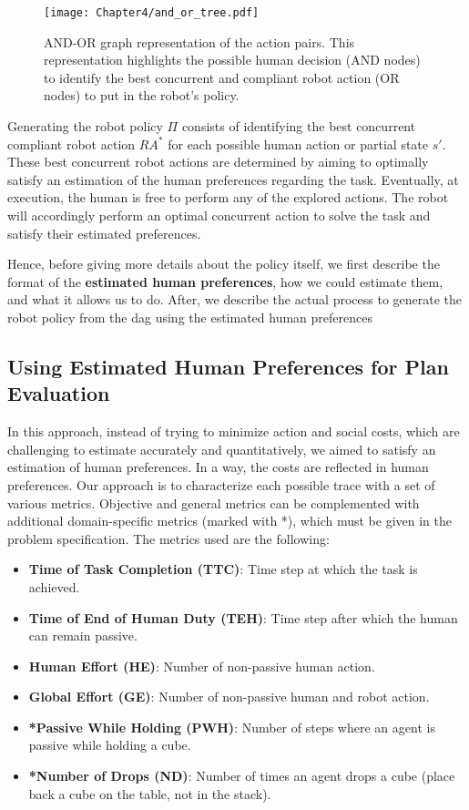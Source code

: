 \begin{figure}[h]
    \texttt{[image: Chapter4/and\_or\_tree.pdf]}
    \caption{AND-OR graph representation of the action pairs. 
    This representation highlights the possible human decision (AND nodes) to identify the best concurrent and compliant robot action (OR nodes) to put in the robot's policy. 
    }
    \label{fig:and_or}
\end{figure}


Generating the robot policy $\Pi$ consists of identifying the best concurrent compliant robot action $RA^*$ for each possible human action or partial state $s'$. These best concurrent robot actions are determined by aiming to optimally satisfy an estimation of the human preferences regarding the task. Eventually, at execution, the human is free to perform any of the explored actions. The robot will accordingly perform an optimal concurrent action to solve the task and satisfy their estimated preferences.

Hence, before giving more details about the policy itself, we first describe the format of the \textbf{estimated human preferences}, how we could estimate them, and what it allows us to do. After, we describe the actual process to generate the robot policy from the \acrshort{dag} using the estimated human preferences


    \subsection*{Using Estimated Human Preferences for Plan Evaluation}

In this approach, instead of trying to minimize action and social costs, which are challenging to estimate accurately and quantitatively, we aimed to satisfy an estimation of human preferences. In a way, the costs are reflected in human preferences. Our approach is to characterize each possible trace with a set of various metrics. Objective and general metrics can be complemented with additional domain-specific metrics (marked with *), which must be given in the problem specification. The metrics used are the following:

\begin{itemize}
    \item \textbf{Time of Task Completion (TTC)}: Time step at which the task is achieved.
    \item \textbf{Time of End of Human Duty (TEH)}: Time step after which the human can remain passive.
    \item \textbf{Human Effort (HE)}: Number of non-passive human action.
    \item \textbf{Global Effort (GE)}: Number of non-passive human and robot action.
    \item \textbf{*Passive While Holding (PWH)}: Number of steps where an agent is passive while holding a cube.
    \item \textbf{*Number of Drops (ND)}: Number of times an agent drops a cube (place back a cube on the table, not in the stack).
\end{itemize}

